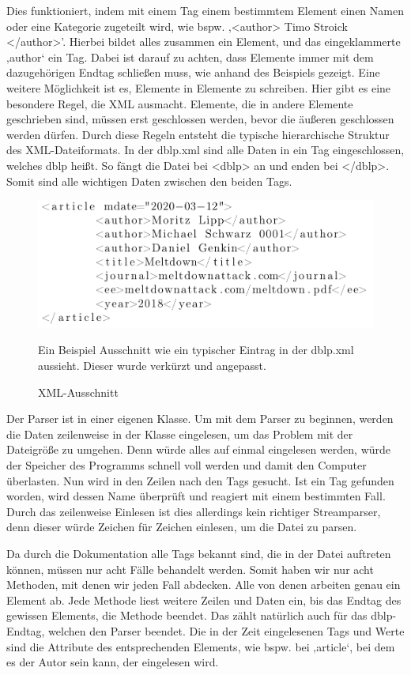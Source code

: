Dies funktioniert, indem mit einem Tag einem bestimmtem Element einen Namen oder eine Kategorie zugeteilt wird, wie bspw. ‚<author> Timo Stroick </author>’. Hierbei bildet alles zusammen ein Element, und das eingeklammerte ‚author‘ ein Tag. Dabei ist darauf zu achten, dass Elemente immer mit dem dazugehörigen Endtag schließen muss, wie anhand des Beispiels gezeigt. 
Eine weitere Möglichkeit ist es, Elemente in Elemente zu schreiben. Hier gibt es eine besondere Regel, die XML ausmacht. Elemente, die in andere Elemente geschrieben sind, müssen erst geschlossen werden, bevor die äußeren geschlossen werden dürfen. Durch diese Regeln entsteht die typische hierarchische Struktur des XML-Dateiformats. In der dblp.xml sind alle Daten in ein Tag eingeschlossen, welches dblp heißt. So fängt die Datei bei <dblp> an und enden bei </dblp>. Somit sind alle wichtigen Daten zwischen den beiden Tags. 

 
\begin{figure}[!htb]
	\centering
	\includegraphics[width=14cm,keepaspectratio]{bilder/xmlAusschnitt}
	\caption{XML-Ausschnitt}
	\label{fig:xmlausschnitt}
	Ein Beispiel Ausschnitt wie ein typischer Eintrag in der dblp.xml aussieht. Dieser wurde verkürzt und angepasst.
\end{figure}

Der Parser ist in einer eigenen Klasse. Um mit dem Parser zu beginnen, werden die Daten zeilenweise in der Klasse eingelesen, um das Problem mit der Dateigröße zu umgehen. Denn würde alles auf einmal eingelesen werden, würde der Speicher des Programms schnell voll werden und damit den Computer überlasten. Nun wird in den Zeilen nach den Tags gesucht. Ist ein Tag gefunden worden, wird dessen Name überprüft und reagiert mit einem bestimmten Fall. Durch das zeilenweise Einlesen ist dies allerdings kein richtiger Streamparser, denn dieser würde Zeichen für Zeichen einlesen, um die Datei zu parsen. 

Da durch die Dokumentation alle Tags bekannt sind, die in der Datei auftreten können, müssen nur acht Fälle behandelt werden. Somit haben wir nur acht Methoden, mit denen wir jeden Fall abdecken. Alle von denen arbeiten genau ein Element ab. Jede Methode liest weitere Zeilen und Daten ein, bis das Endtag des gewissen Elements, die Methode beendet. Das zählt natürlich auch für das dblp-Endtag, welchen den Parser beendet. Die in der Zeit eingelesenen Tags und Werte sind die Attribute des entsprechenden Elements, wie bspw. bei ‚article‘, bei dem es der Autor sein kann, der eingelesen wird. 









